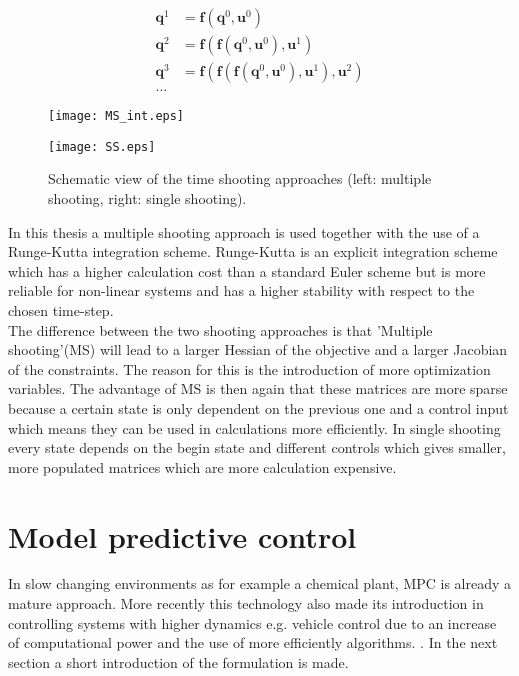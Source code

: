 \begin{enumerate}
	\begin{equation}\label{eq:2}
	\begin{aligned}
	\bm{q}^1 &= \bm{f}(\bm{q}^0, \bm{u}^0)\\
	\bm{q}^2 &= \bm{f}(\bm{f}(\bm{q}^0, \bm{u}^0), \bm{u}^1)\\
	\bm{q}^3 &= \bm{f}(\bm{f}(\bm{f}(\bm{q}^0, \bm{u}^0), \bm{u}^1), \bm{u}^2)\\
	...
	\end{aligned}
	\end{equation}
\end{enumerate}

\begin{figure}[htp]
	\centering
	\begin{minipage}{0.49\textwidth}
		\centering
		\texttt{[image: MS\_int.eps]}
	\end{minipage}
	\hfill
	\begin{minipage}{.49\textwidth}
		\centering
		\texttt{[image: SS.eps]}
	\end{minipage}
	\caption{Schematic view of the time shooting approaches (left: multiple shooting, right: single shooting).}
	\label{fig:TS}
\end{figure}

In this thesis a multiple shooting approach is used together with the use of a Runge-Kutta integration scheme. Runge-Kutta is an explicit integration scheme which has a higher calculation cost than a standard Euler scheme but is more reliable for non-linear systems and has a higher stability with respect to the chosen time-step. \cite{Mercy2018}  \\ 

The difference between the two shooting approaches is that 'Multiple shooting'(MS) will lead to a larger Hessian of the objective and a larger Jacobian of the constraints. The reason for this is the introduction of more optimization variables. The advantage of MS is then again that these matrices are more sparse because a certain state is only dependent on the previous one and a control input which means they can be used in calculations more efficiently. In single shooting every state depends on the begin state and different controls which gives smaller, more populated matrices which are more calculation expensive. \cite{Gillis2019}

\section{Model predictive control}
\label{s:MPC_e}
In slow changing environments as for example a chemical plant, MPC is already a mature approach. More recently this technology also made its introduction in controlling systems with higher dynamics e.g. vehicle control due to an increase of computational power and the use of more efficiently algorithms. \cite{Mercy2018}. In the next section a short introduction of the formulation is made. \\

